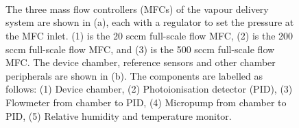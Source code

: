 \documentclass[
  a4paper,
]{scrbook}
\begin{document}
\begin{figure}
\begin{minipage}[t]{0.11\linewidth}
{~

}

\end{minipage}%
%
\begin{minipage}[t]{0.03\linewidth}

{\centering 


}

\end{minipage}%
%
\begin{minipage}[t]{0.01\linewidth}

{\centering 

~

}

\end{minipage}%
%
\begin{minipage}[t]{0.70\linewidth}

{\centering 


}

\end{minipage}%
%
\begin{minipage}[t]{0.15\linewidth}

{\centering 

~

}

\end{minipage}%

\caption{\label{fig-delivery-system}The three mass flow controllers
(MFCs) of the vapour delivery system are shown in (a), each with a
regulator to set the pressure at the MFC inlet. (1) is the 20 sccm
full-scale flow MFC, (2) is the 200 sccm full-scale flow MFC, and (3) is
the 500 sccm full-scale flow MFC. The device chamber, reference sensors
and other chamber peripherals are shown in (b). The components are
labelled as follows: (1) Device chamber, (2) Photoionisation detector
(PID), (3) Flowmeter from chamber to PID, (4) Micropump from chamber to
PID, (5) Relative humidity and temperature monitor.}

\end{figure}
\end{document}
